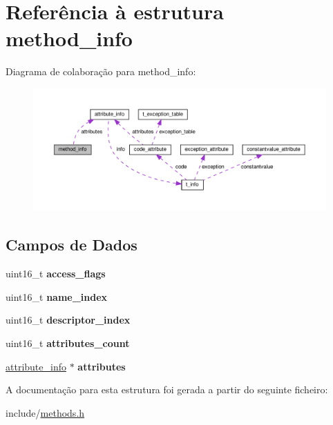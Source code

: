 \hypertarget{structmethod__info}{}\section{Referência à estrutura method\+\_\+info}
\label{structmethod__info}


Diagrama de colaboração para method\+\_\+info\+:\nopagebreak
\begin{figure}[H]
\begin{center}
\leavevmode
\includegraphics[width=350pt]{structmethod__info__coll__graph}
\end{center}
\end{figure}
\subsection*{Campos de Dados}
\begin{DoxyCompactItemize}
\item 
\mbox{\label{structmethod__info_a8fc68aba419f2617deda879c467f5410}} 
uint16\+\_\+t {\bfseries access\+\_\+flags}
\item 
\mbox{\label{structmethod__info_af0ba3d6d566432e74eed5c37cd998c14}} 
uint16\+\_\+t {\bfseries name\+\_\+index}
\item 
\mbox{\label{structmethod__info_abccd6a5202d4c0ee1be6b89692d0352a}} 
uint16\+\_\+t {\bfseries descriptor\+\_\+index}
\item 
\mbox{\label{structmethod__info_a9e711e4dfb8181f7dce16c6f640ba734}} 
uint16\+\_\+t {\bfseries attributes\+\_\+count}
\item 
\mbox{\label{structmethod__info_a8ce4caaa03680c91f548558a38647ad8}} 
\hyperlink{structattribute__info}{attribute\+\_\+info} $\ast$ {\bfseries attributes}
\end{DoxyCompactItemize}


A documentação para esta estrutura foi gerada a partir do seguinte ficheiro\+:\begin{DoxyCompactItemize}
\item 
include/\hyperlink{methods_8h}{methods.\+h}\end{DoxyCompactItemize}
